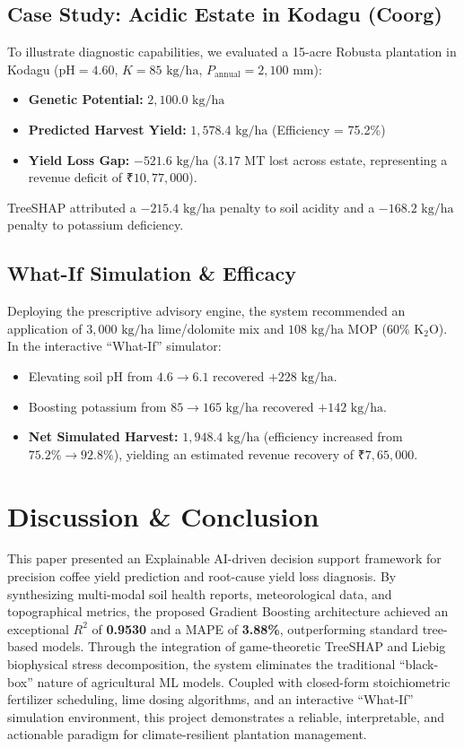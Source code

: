 \documentclass[conference]{IEEEtran}
\begin{document}
\subsection{Case Study: Acidic Estate in Kodagu (Coorg)}
To illustrate diagnostic capabilities, we evaluated a 15-acre Robusta plantation in Kodagu ($\text{pH} = 4.60$, $K = 85\text{ kg/ha}$, $P_{\text{annual}} = 2,100\text{ mm}$):
\begin{itemize}
    \item \textbf{Genetic Potential:} $2,100.0\text{ kg/ha}$
    \item \textbf{Predicted Harvest Yield:} $1,578.4\text{ kg/ha}$ (Efficiency = 75.2\%)
    \item \textbf{Yield Loss Gap:} $-521.6\text{ kg/ha}$ ($3.17\text{ MT}$ lost across estate, representing a revenue deficit of ₹$10,77,000$).
\end{itemize}
TreeSHAP attributed a $-215.4\text{ kg/ha}$ penalty to soil acidity and a $-168.2\text{ kg/ha}$ penalty to potassium deficiency.

\subsection{What-If Simulation \& Efficacy}
Deploying the prescriptive advisory engine, the system recommended an application of $3,000\text{ kg/ha}$ lime/dolomite mix and $108\text{ kg/ha}$ MOP ($60\%\text{ K}_2\text{O}$). In the interactive ``What-If'' simulator:
\begin{itemize}
    \item Elevating soil pH from $4.6 \to 6.1$ recovered $+228\text{ kg/ha}$.
    \item Boosting potassium from $85 \to 165\text{ kg/ha}$ recovered $+142\text{ kg/ha}$.
    \item \textbf{Net Simulated Harvest:} $1,948.4\text{ kg/ha}$ (efficiency increased from $75.2\% \to 92.8\%$), yielding an estimated revenue recovery of ₹$7,65,000$.
\end{itemize}

\section{Discussion \& Conclusion}
This paper presented an Explainable AI-driven decision support framework for precision coffee yield prediction and root-cause yield loss diagnosis. By synthesizing multi-modal soil health reports, meteorological data, and topographical metrics, the proposed Gradient Boosting architecture achieved an exceptional $R^2$ of \textbf{0.9530} and a MAPE of \textbf{3.88\%}, outperforming standard tree-based models. Through the integration of game-theoretic TreeSHAP and Liebig biophysical stress decomposition, the system eliminates the traditional ``black-box'' nature of agricultural ML models. Coupled with closed-form stoichiometric fertilizer scheduling, lime dosing algorithms, and an interactive ``What-If'' simulation environment, this project demonstrates a reliable, interpretable, and actionable paradigm for climate-resilient plantation management.
\end{document}
